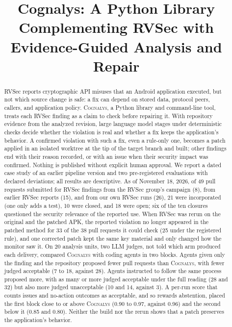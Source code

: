 \documentclass[conference]{IEEEtran}
\title{Cognalys: A Python Library Complementing RVSec with Evidence-Guided Analysis and Repair}
\author{\IEEEauthorblockN{João Pedro Antonow}
\IEEEauthorblockA{Department of Computer Science (CIC)\\
University of Brasília (UnB)\\
Brasília, Brazil\\
\texttt{jpantonow@gmail.com}\\[3pt]
Advisor: Prof.\ Rodrigo Bonifácio\\Co-advisor: Prof.\ Guilherme Novaes Ramos}}
\newcommand{\system}{\textsc{Cognalys}}
\begin{document}
\maketitle

\begin{abstract}
RVSec reports cryptographic API misuses that an Android application executed,
but not which source change is safe: a fix can depend on stored data, protocol
peers, callers, and application policy. \system, a Python library and
command-line tool, treats each RVSec finding as a claim to check before
repairing it. With repository evidence from the analyzed revision, large
language model stages under deterministic checks decide whether the violation
is real and whether a fix keeps the application's behavior. A confirmed
violation with such a fix, even a rule-only one, becomes a patch applied in an
isolated worktree at the tip of the target branch and built; other findings
end with their reason recorded, or with an issue when their security impact
was confirmed. Nothing is published without explicit human approval.
We report a dated case study of an earlier pipeline version and two
pre-registered evaluations with declared deviations; all results are
descriptive. As of November 18, 2026, of 49 pull requests submitted for RVSec
findings from the RVSec group's campaign (8), from earlier RVSec reports (15),
and from our own RVSec runs (26), 21 were incorporated (one only adds a test), 10 were closed, and 18
were open; six of the ten closures questioned the security relevance of the
reported use. When RVSec was rerun on the original and the patched APK, the
reported violation no longer appeared in the patched method for 33 of
the 38 pull requests it could check (25 under the registered rule), and one corrected patch kept
the same key material and only changed how the monitor saw it. On 20 analysis units, two LLM judges, not told which arm produced each delivery,
compared \system{} with coding agents in two blocks. Agents given only the
finding and the repository proposed fewer pull requests than \system{}, with
fewer judged acceptable (7 to 18, against 28). Agents instructed to follow the
same process proposed more, with as many or more judged acceptable under the full
reading (28 and 32) but also more judged unacceptable (10 and 14, against 3).
A per-run score that counts issues and no-action outcomes as acceptable, and so
rewards abstention, placed the first block close to or above \system{} (0.90 to
0.97, against 0.96) and the second below it (0.85 and 0.80). Neither the build nor the rerun shows that a patch preserves the
application's behavior.
\end{abstract}
\end{document}
